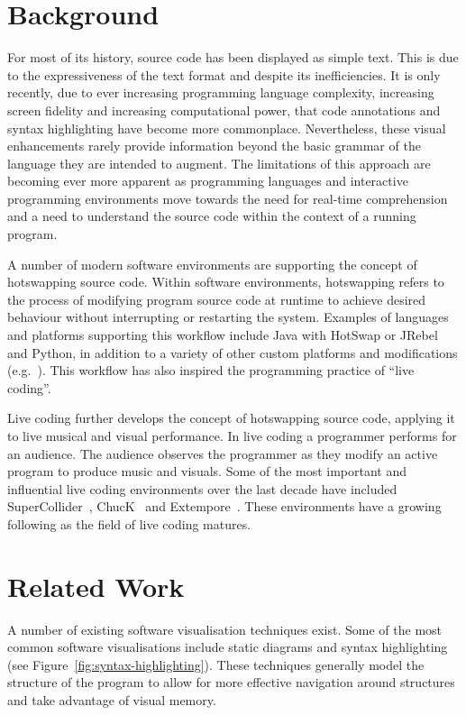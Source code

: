 \section{Background}

For most of its history, source code has been displayed as simple text. This is due to the expressiveness of the text format and despite its inefficiencies.
It is only recently, due to ever increasing programming language complexity, increasing screen fidelity and increasing computational power, that code annotations and syntax highlighting have become more commonplace. Nevertheless, these visual enhancements rarely provide information beyond the basic grammar of the language they are intended to augment. The limitations of this approach are becoming ever more apparent as programming languages and interactive programming environments move towards the need for real-time comprehension and a need to understand the source code within the context of a running program.

A number of modern software environments are supporting the concept of hotswapping source code. Within software environments, hotswapping refers to the process of modifying program source code at runtime to achieve desired behaviour without interrupting or restarting the system. Examples of languages and platforms supporting this workflow include Java with HotSwap or JRebel~\cite{ZeroTurnaround2014} and Python, in addition to a variety of other custom platforms and modifications (e.g.~\cite{Thomas2011}). This workflow has also inspired the programming practice of ``live coding''. 

Live coding further develops the concept of hotswapping source code, applying it to live musical and visual performance. In live coding a programmer performs for an audience. The audience observes the programmer as they modify an active program to produce music and visuals. Some of the most important and influential live coding environments over the last decade have included SuperCollider~\cite{McCartney}, ChucK~\cite{Wang2008} and Extempore~\cite{Sorensen}. These environments have a growing following as the field of live coding matures.

\section{Related Work}

A number of existing software visualisation techniques exist. Some of the most common software visualisations include static diagrams and syntax highlighting (see Figure~\ref{fig:syntax-highlighting}). These techniques generally model the structure of the program to allow for more effective navigation around structures and take advantage of visual memory.

